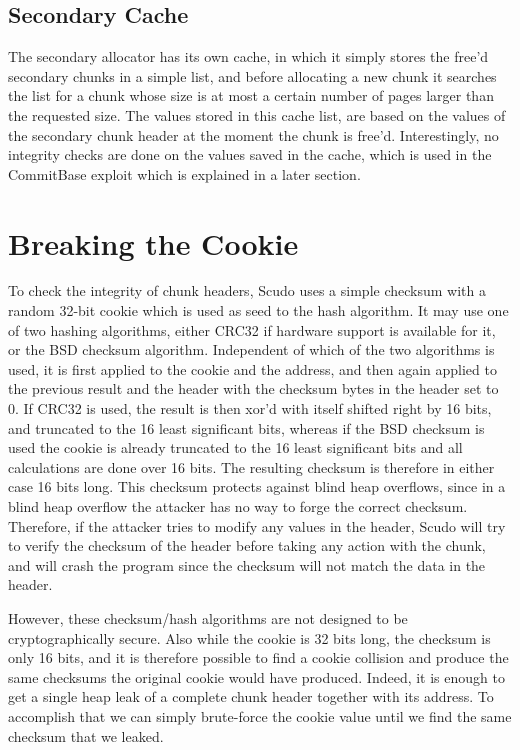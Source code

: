 \documentclass[a4paper,11pt,oneside]{report}
\begin{document}
\section{Secondary Cache}

The secondary allocator has its own cache, in which it simply stores the free'd secondary
chunks in a simple list, and before allocating a new chunk it searches the list for a
chunk whose size is at most a certain number of pages larger than the requested size. The
values stored in this cache list, are based on the values of the secondary chunk header at
the moment the chunk is free'd. Interestingly, no integrity checks are done on the values
saved in the cache, which is used in the CommitBase exploit which is explained in a later
section.


\chapter{Breaking the Cookie}

To check the integrity of chunk headers, Scudo uses a simple checksum with a random 32-bit
cookie which is used as seed to the hash algorithm. It may use one of two hashing
algorithms, either CRC32 if hardware support is available for it, or the BSD checksum
algorithm. Independent of which of the two algorithms is used, it is first applied to the
cookie and the address, and then again applied to the previous result and the header with
the checksum bytes in the header set to 0. If CRC32 is used, the result is then xor'd with
itself shifted right by 16 bits, and truncated to the 16 least significant bits, whereas
if the BSD checksum is used the cookie is already truncated to the 16 least significant
bits and all calculations are done over 16 bits. The resulting checksum is therefore in
either case 16 bits long.
This checksum protects against blind heap overflows, since in a blind heap overflow the
attacker has no way to forge the correct checksum. Therefore, if the attacker tries to
modify any values in the header, Scudo will try to verify the checksum of the header
before taking any action with the chunk, and will crash the program since the checksum
will not match the data in the header.

However, these checksum/hash algorithms are not designed to be cryptographically
secure. Also while the cookie is 32 bits long, the checksum is only 16 bits, and it is
therefore possible to find a cookie collision and produce the same checksums the original
cookie would have produced. Indeed, it is enough to get a single heap leak of a complete
chunk header together with its address. To accomplish that we can simply brute-force the
cookie value until we find the same checksum that we leaked.
\end{document}

